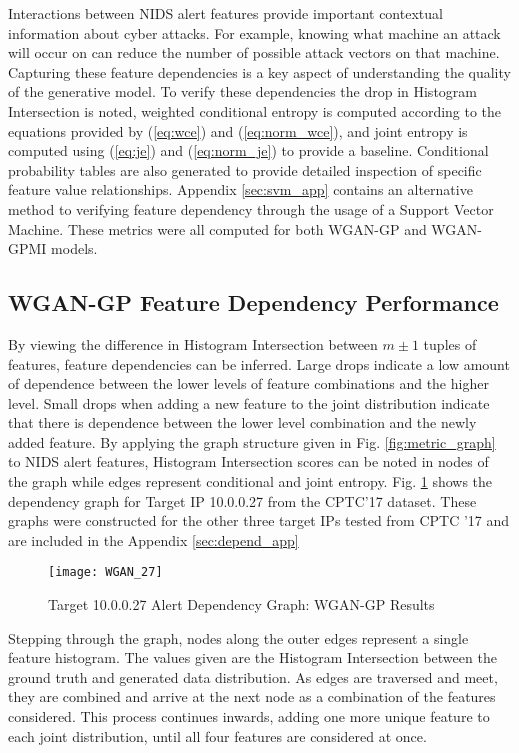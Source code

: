 Interactions between NIDS alert features provide important contextual information about cyber attacks. For example, knowing what machine an attack will occur on can reduce the number of possible attack vectors on that machine. Capturing these feature dependencies is a key aspect of understanding the quality of the generative model. To verify these dependencies the drop in Histogram Intersection is noted, weighted conditional entropy is computed according to the equations provided by (\ref{eq:wce}) and (\ref{eq:norm_wce}), and joint entropy is computed using (\ref{eq:je}) and (\ref{eq:norm_je}) to provide a baseline. Conditional probability tables are also generated to provide detailed inspection of specific feature value relationships. Appendix \ref{sec:svm_app} contains an alternative method to verifying feature dependency through the usage of a Support Vector Machine. These metrics were all computed for both WGAN-GP and WGAN-GPMI models.

\subsection{WGAN-GP Feature Dependency Performance}

By viewing the difference in Histogram Intersection between $m\pm1$ tuples of features, feature dependencies can be inferred. Large drops indicate a low amount of dependence between the lower levels of feature combinations and the higher level. Small drops when adding a new feature to the joint distribution indicate that there is dependence between the lower level combination and the newly added feature. By applying the graph structure given in Fig. \ref{fig:metric_graph} to NIDS alert features, Histogram Intersection scores can be noted in nodes of the graph while edges represent conditional and joint entropy. Fig. \ref{fig:alert_depend_1} shows the dependency graph for Target IP 10.0.0.27 from the CPTC'17 dataset. These graphs were constructed for the other three target IPs tested from CPTC '17 and are included in the Appendix \ref{sec:depend_app}

\begin{figure}[!htbp]
	\centering
	\texttt{[image: WGAN\_27]}
	\caption{
		Target 10.0.0.27 Alert Dependency Graph: WGAN-GP Results
	}
	\label{fig:alert_depend_1}
\end{figure}

Stepping through the graph, nodes along the outer edges represent a single feature histogram. The values given are the Histogram Intersection between the ground truth and generated data distribution. As edges are traversed and meet, they are combined and arrive at the next node as a combination of the features considered. This process continues inwards, adding one more unique feature to each joint distribution, until all four features are considered at once.

